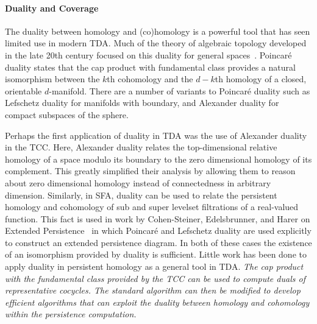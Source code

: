 
\paragraph{Duality and Coverage}

The duality between homology and (co)homology is a powerful tool that has seen limited use in modern TDA.
Much of the theory of algebraic topology developed in the late 20th century focused on this duality for general spaces~\cite{spanier66algebraic,munkres84elements,bredon93,hatcher01}.
Poincar\'e duality states that the cap product with fundamental class provides a natural isomorphism between the $k$th cohomology and the $d-k$th homology of a closed, orientable $d$-manifold.
There are a number of variants to Poincar\'e duality such as Lefschetz duality for manifolds with boundary, and Alexander duality for compact subspaces of the sphere.

Perhaps the first application of duality in TDA was the use of Alexander duality in the TCC.
Here, Alexander duality relates the top-dimensional relative homology of a space modulo its boundary to the zero dimensional homology of its complement.
This greatly simplified their analysis by allowing them to reason about zero dimensional homology instead of connectedness in arbitrary dimension.
Similarly, in SFA, duality can be used to relate the persistent homology and cohomology of sub and super levelset filtrations of a real-valued function.
This fact is used  in work by Cohen-Steiner, Edelsbrunner, and Harer on Extended Persistence~\cite{cohen09extending} in which Poincar\'e and Lefschetz duality are used explicitly to construct an extended persistence diagram.
In both of these cases the existence of an isomorphism provided by duality is sufficient.
Little work has been done to apply duality in persistent homology as a general tool in TDA.
\emph{The cap product with the fundamental class provided by the TCC can be used to compute duals of representative cocycles.
The standard algorithm can then be modified to develop efficient algorithms that can exploit the duality between homology and cohomology within the persistence computation.}
